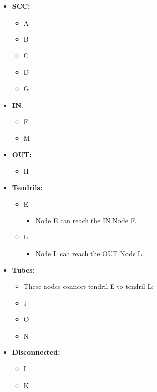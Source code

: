 \documentclass[12pt]{article}
\begin{document}
\begin{itemize}
    \item \textbf{SCC:}
    \begin{itemize}
        \item A
        \item B
        \item C
        \item D
        \item G
    \end{itemize}
    \item \textbf{IN:}
    \begin{itemize}
        \item F
        \item M
    \end{itemize}
    \item \textbf{OUT:}
    \begin{itemize}
        \item H
    \end{itemize}
    \item \textbf{Tendrils:}
    \begin{itemize}
        \item E
        \begin{itemize}
            \item {Node E can reach the IN Node F.}
        \end{itemize}
        \item L
        \begin{itemize}
            \item {Node L can reach the OUT Node L.}
        \end{itemize}
    \end{itemize}
    \item \textbf{Tubes:}
    \begin{itemize}
        \item[] These nodes connect tendril E to tendril L:
        \item J
        \item O
        \item N
    \end{itemize}
    \clearpage
    \item \textbf{Disconnected:}
    \begin{itemize}
        \item I
        \item K
    \end{itemize}
    
\end{itemize}
\end{document}
